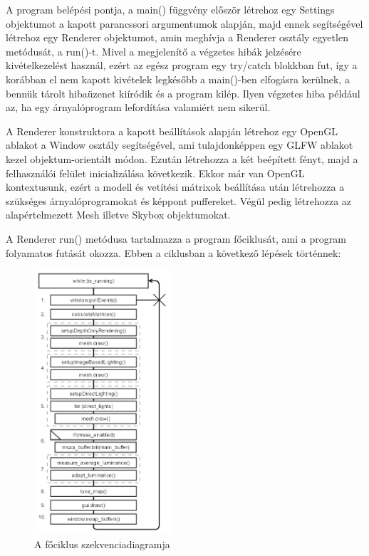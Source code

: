 A program belépési pontja, a main() függvény először létrehoz egy Settings objektumot a kapott parancssori argumentumok alapján, majd ennek segítségével létrehoz egy Renderer objektumot, amin meghívja a Renderer osztály egyetlen metódusát, a run()-t. Mivel a megjelenítő a végzetes hibák jelzésére kivételkezelést használ, ezért az egész program egy try/catch blokkban fut, így a korábban el nem kapott kivételek legkésőbb a main()-ben elfogásra kerülnek, a bennük tárolt hibaüzenet kiíródik és a program kilép. Ilyen végzetes hiba például az, ha egy árnyalóprogram lefordítása valamiért nem sikerül.

A Renderer konstruktora a kapott beállítások alapján létrehoz egy OpenGL ablakot a Window osztály segítségével, ami tulajdonképpen egy GLFW ablakot kezel objektum-orientált módon. Ezután létrehozza a két beépített fényt, majd a felhasználói felület inicializálása következik. Ekkor már van OpenGL kontextusunk, ezért a modell és vetítési mátrixok beállítása után létrehozza a szükséges árnyalóprogramokat és képpont puffereket. Végül pedig létrehozza az alapértelmezett Mesh illetve Skybox objektumokat.

A Renderer run() metódusa tartalmazza a program főciklusát, ami a program folyamatos futását okozza. Ebben a ciklusban a következő lépések történnek:

\begin{figure}[!ht]
    \centering
    \includegraphics[width=0.45\textwidth]{images/main_loop.png}
    \caption{A főciklus szekvenciadiagramja}
\end{figure}

